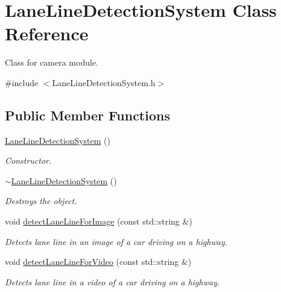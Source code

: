 \hypertarget{class_lane_line_detection_system}{}\section{Lane\+Line\+Detection\+System Class Reference}
\label{class_lane_line_detection_system}


Class for camera module.  




{\ttfamily \#include $<$Lane\+Line\+Detection\+System.\+h$>$}

\subsection*{Public Member Functions}
\begin{DoxyCompactItemize}
\item 
\mbox{\hyperlink{class_lane_line_detection_system_a3c4a4a3e0387da68a9e98933d9d22519}{Lane\+Line\+Detection\+System}} ()
\begin{DoxyCompactList}\small\item\em Constructor. \end{DoxyCompactList}\item 
\mbox{\hyperlink{class_lane_line_detection_system_ad4334d4fe769dcb6e53efc1913d86c81}{$\sim$\+Lane\+Line\+Detection\+System}} ()
\begin{DoxyCompactList}\small\item\em Destroys the object. \end{DoxyCompactList}\item 
void \mbox{\hyperlink{class_lane_line_detection_system_ac8e63a39cd08f46aeb4717c2e5ab2798}{detect\+Lane\+Line\+For\+Image}} (const std\+::string \&)
\begin{DoxyCompactList}\small\item\em Detects lane line in an image of a car driving on a highway. \end{DoxyCompactList}\item 
void \mbox{\hyperlink{class_lane_line_detection_system_a32fd8f62c205e81770ab11c77c5e48f4}{detect\+Lane\+Line\+For\+Video}} (const std\+::string \&)
\begin{DoxyCompactList}\small\item\em Detects lane line in a video of a car driving on a highway. \end{DoxyCompactList}\end{DoxyCompactItemize}


